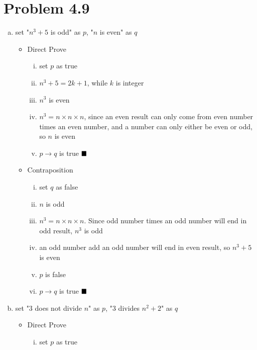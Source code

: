 \documentclass{article}
\def\math#1{$#1$}
\begin{document}
\section{Problem 4.9}
\begin{enumerate}[(a)]
    \item set "\math{{n}^{3} + 5} is odd" as \math{p}, "\math{n} is even" as \math{q}
    \begin{itemize}
        \item Direct Prove
            \begin{enumerate}[i)]
             \item set \math{p} as true
             \item \math{{n}^{3} + 5 = 2k + 1}, while \math{k} is integer
             \item \math{{n}^{3}} is even
             \item \math{{n}^{3} = n \times n \times n}, since an even result can only come from even number times an even number, and a number can only either be even or odd, so \math{n} is even
             \item \math{p \to q} is true \math{\hfill{\blacksquare}}
            \end{enumerate}
        \item Contraposition
             \begin{enumerate}[i)]
                 \item set \math{q} as false
                 \item \math{n} is odd
                 \item \math{{n}^3 = n \times n \times n}. Since odd number times an odd number will end in odd result, \math{{n}^{3}} is odd
                 \item an odd number add an odd number will end in even result, so \math{{n}^{3} + 5} is even
                 \item \math{p} is false
                 \item \math{p \to q} is true \math{\hfill{\blacksquare}}
            \end{enumerate}
    \end{itemize}
    \item set "3 does not divide \math{n}" as \math{p}, "3 divides \math{{n}^{2} + 2}" as \math{q}
        \begin{itemize}
            \item Direct Prove
                \begin{enumerate}[i)]
                    \item set \math{p} as true

\end{enumerate}
\end{itemize}
\end{enumerate}
\end{document}
